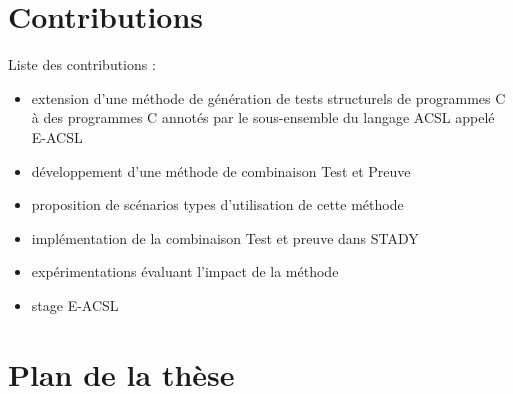 \section{Contributions}
\label{sec:contrib}




Liste des contributions :
\begin{itemize}
\item extension d'une méthode de génération de tests structurels de programmes C
  à des programmes C annotés par le sous-ensemble du langage ACSL appelé E-ACSL
\item développement d'une méthode de combinaison Test et Preuve
\item proposition de scénarios types d'utilisation de cette méthode
\item implémentation de la combinaison Test et preuve dans STADY
\item expérimentations évaluant l'impact de la méthode
\item stage E-ACSL
\end{itemize}


\section{Plan de la thèse}
\label{sec:plan}


